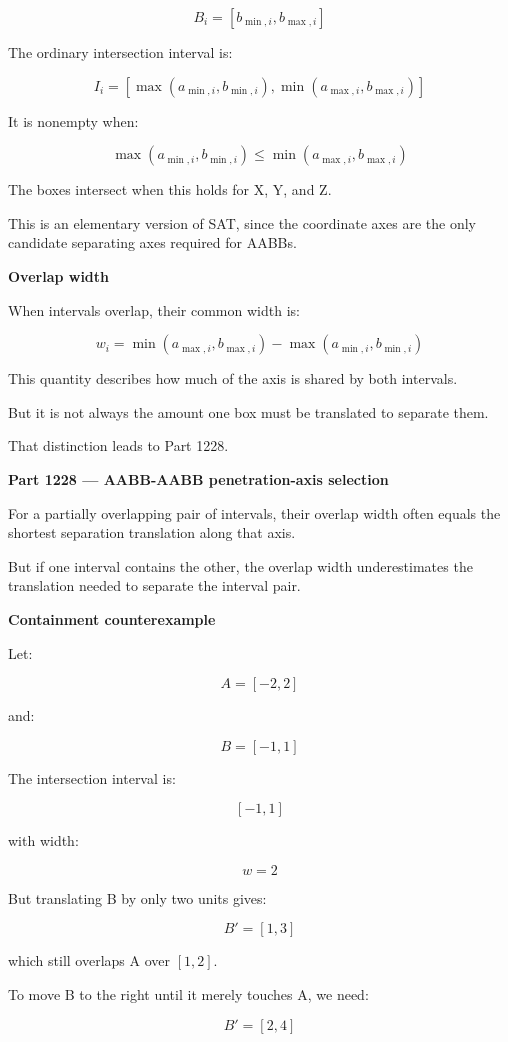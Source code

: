 \[
B_i=[b_{\min,i},b_{\max,i}]
\]

The ordinary intersection interval is:

\[
\boxed{ I_i=[ \max(a_{\min,i},b_{\min,i}), \min(a_{\max,i},b_{\max,i}) ] }
\]

It is nonempty when:

\[
\boxed{ \max(a_{\min,i},b_{\min,i}) \le \min(a_{\max,i},b_{\max,i}) }
\]

The boxes intersect when this holds for X, Y, and Z.

This is an elementary version of SAT, since the coordinate axes are the only candidate separating axes required for AABBs.

\textbf{Overlap width}

When intervals overlap, their common width is:

\[
\boxed{ w_i= \min(a_{\max,i},b_{\max,i}) - \max(a_{\min,i},b_{\min,i}) }
\]

This quantity describes how much of the axis is shared by both intervals.

But it is not always the amount one box must be translated to separate them.

That distinction leads to Part 1228.

\textbf{Part 1228 --- AABB-AABB penetration-axis selection}

For a partially overlapping pair of intervals, their overlap width often equals the shortest separation translation along that axis.

But if one interval contains the other, the overlap width underestimates the translation needed to separate the interval pair.

\textbf{Containment counterexample}

Let:

\[
A=[-2,2]
\]

and:

\[
B=[-1,1]
\]

The intersection interval is:

\[
[-1,1]
\]

with width:

\[
w=2
\]

But translating B by only two units gives:

\[
B'=[1,3]
\]

which still overlaps A over \([1,2]\).

To move B to the right until it merely touches A, we need:

\[
B'=[2,4]
\]

